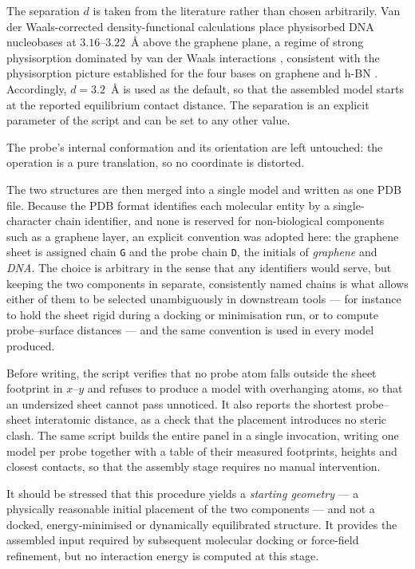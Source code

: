 The separation $d$ is taken from the literature rather than chosen arbitrarily. Van der
Waals-corrected density-functional calculations place physisorbed DNA nucleobases at
$3.16$--$3.22$~\AA{} above the graphene plane, a regime of strong physisorption dominated by van
der Waals interactions \citep{tayo2023}, consistent with the physisorption picture established for
the four bases on graphene and h-BN \citep{lee2013}. Accordingly, $d = 3.2$~\AA{} is used as the
default, so that the assembled model starts at the reported equilibrium contact distance. The
separation is an explicit parameter of the script and can be set to any other value.

The probe's internal conformation and its orientation are left untouched: the operation is a pure
translation, so no coordinate is distorted.

The two structures are then merged into a single model and written as one PDB file. Because the PDB
format identifies each molecular entity by a single-character chain identifier, and none is
reserved for non-biological components such as a graphene layer, an explicit convention was adopted
here: the graphene sheet is assigned chain \texttt{G} and the probe chain \texttt{D}, the initials
of \emph{graphene} and \emph{DNA}. The choice is arbitrary in the sense that any identifiers would
serve, but keeping the two components in separate, consistently named chains is what allows either
of them to be selected unambiguously in downstream tools --- for instance to hold the sheet rigid
during a docking or minimisation run, or to compute probe--surface distances --- and the same
convention is used in every model produced.

Before writing, the script verifies that no probe atom falls outside the sheet footprint in
$x$--$y$ and refuses to produce a model with overhanging atoms, so that an undersized sheet cannot
pass unnoticed. It also reports the shortest probe--sheet interatomic distance, as a check that the
placement introduces no steric clash. The same script builds the entire panel in a single
invocation, writing one model per probe together with a table of their measured footprints,
heights and closest contacts, so that the assembly stage requires no manual intervention.

It should be stressed that this procedure yields a \emph{starting geometry} --- a physically
reasonable initial placement of the two components --- and not a docked, energy-minimised or
dynamically equilibrated structure. It provides the assembled input required by subsequent
molecular docking or force-field refinement, but no interaction energy is computed at this stage.

